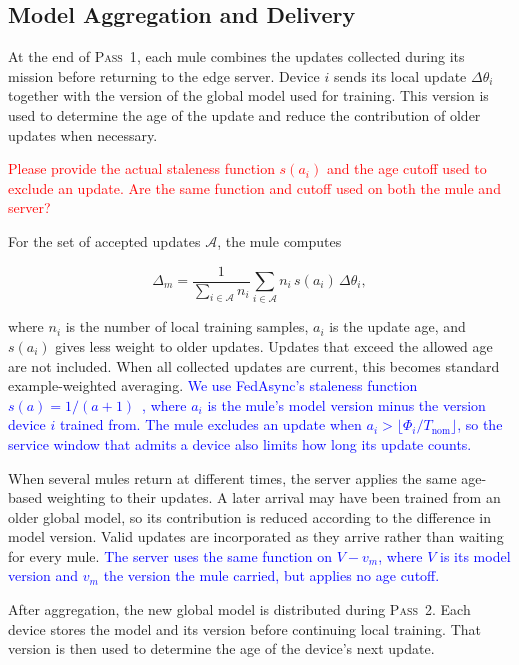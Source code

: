 \documentclass[conference]{IEEEtran}
\begin{document}
\subsection{Model Aggregation and Delivery}
\label{sec:aggregation}

At the end of \textsc{Pass~1}, each mule combines the updates collected during
its mission before returning to the edge server. Device $i$ sends its local
update $\Delta\theta_i$ together with the version of the global model used for
training. This version is used to determine the age of the update and reduce
the contribution of older updates when necessary.

\textcolor{red}{Please provide the actual staleness function \(s(a_i)\) and the age cutoff used to exclude an update. Are the same function and cutoff used on both the mule and server?}

For the set of accepted updates $\mathcal{A}$, the mule computes

\begin{equation}
\Delta_m =
\frac{1}{\sum_{i\in\mathcal{A}} n_i}
\sum_{i\in\mathcal{A}}
n_i\,s(a_i)\,\Delta\theta_i ,
\label{eq:mule-aggregation}
\end{equation}

where $n_i$ is the number of local training samples, $a_i$ is the update age,
and $s(a_i)$ gives less weight to older updates. Updates that exceed the allowed
age are not included. When all collected updates are current, this becomes
standard example-weighted averaging. \textcolor{blue}{We use FedAsync's staleness function $s(a)=1/(a+1)$~\cite{xie2019asynchronous},
where $a_i$ is the mule's model version minus the version device $i$ trained from.
The mule excludes an update when $a_i>\lfloor\Phi_i/T_{\mathrm{nom}}\rfloor$, so
the service window that admits a device also limits how long its update counts.}

When several mules return at different times, the server applies the same
age-based weighting to their updates. A later arrival may have been trained
from an older global model, so its contribution is reduced according to the
difference in model version. Valid updates are incorporated as they arrive
rather than waiting for every mule. \textcolor{blue}{The server uses the same function on $V-v_m$, where $V$ is its model version and
$v_m$ the version the mule carried, but applies no age cutoff.}

After aggregation, the new global model is distributed during
\textsc{Pass~2}. Each device stores the model and its version before continuing
local training. That version is then used to determine the age of the device's
next update.
\end{document}
